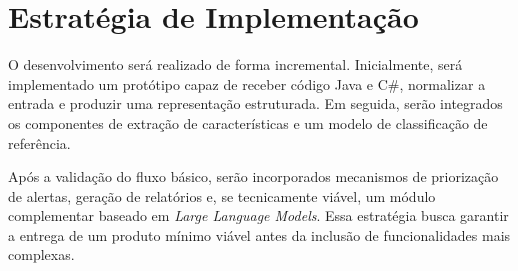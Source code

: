 \section{Estratégia de Implementação}

O desenvolvimento será realizado de forma incremental. Inicialmente, será
implementado um protótipo capaz de receber código Java e C\#, normalizar a
entrada e produzir uma representação estruturada. Em seguida, serão
integrados os componentes de extração de características e um modelo de
classificação de referência.

Após a validação do fluxo básico, serão incorporados mecanismos de
priorização de alertas, geração de relatórios e, se tecnicamente viável, um
módulo complementar baseado em \textit{Large Language Models}. Essa
estratégia busca garantir a entrega de um produto mínimo viável antes da
inclusão de funcionalidades mais complexas.
